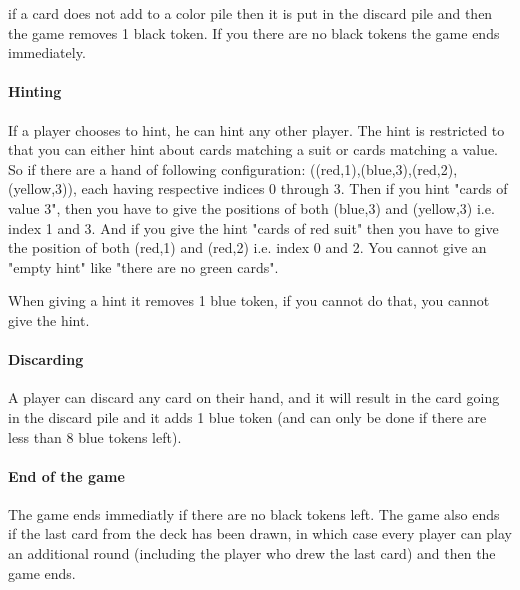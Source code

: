 if a card does not add to a color pile then it is put in the discard pile and then the game removes 1 black token. 
If you there are no black tokens the game ends immediately.  

\paragraph{Hinting}
If a player chooses to hint, he can hint any other player. The hint is restricted to that you can either hint about cards matching a suit or cards matching a value. 
So if there are a hand of following configuration: ((red,1),(blue,3),(red,2),(yellow,3)), each having respective indices 0 through 3. 
Then if you hint "cards of value 3", then you have to give the positions of both (blue,3) and (yellow,3) i.e. index 1 and 3. 
And if you give the hint "cards of red suit" then you have to give the position of both (red,1) and (red,2) i.e. index 0 and 2. 
You cannot give an "empty hint" like "there are no green cards".

When giving a hint it removes 1 blue token, if you cannot do that, you cannot give the hint.

\paragraph{Discarding}
A player can discard any card on their hand, and it will result in the card going in the discard pile and it adds 1 blue token (and can only be done if there are less than 8 blue tokens left).

\paragraph{End of the game}
The game ends immediatly if there are no black tokens left. The game also ends if the last card from the deck has been drawn, in which case every player can play an additional round (including the player who drew the last card) and then the game ends.




